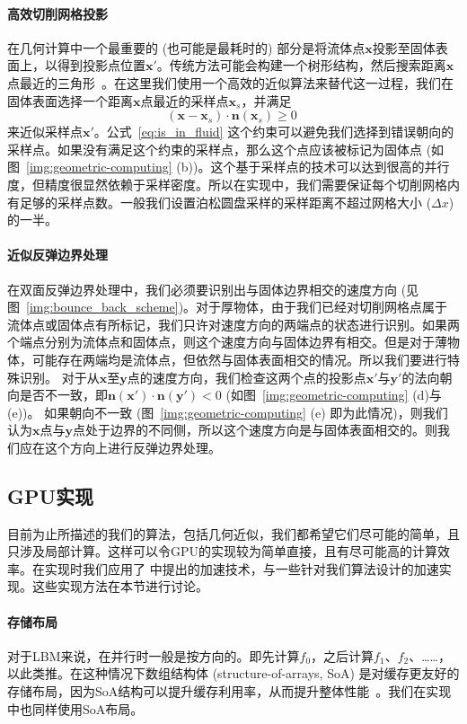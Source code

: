 \paragraph{高效切削网格投影}
在几何计算中一个最重要的 (也可能是最耗时的) 部分是将流体点$\bm{x}$投影至固体表面上，以得到投影点位置$\bm{x}'$。传统方法可能会构建一个树形结构，然后搜索距离$\bm{x}$点最近的三角形~\citep{wang-2012}。在这里我们使用一个高效的近似算法来替代这一过程，我们在固体表面选择一个距离$\bm{x}$点最近的采样点$\bm{x}_s$，并满足
\begin{equation}\label{eq:is_in_fluid}
(\bm{x}-\bm{x}_s)\cdot \bm{n}(\bm{x}_s) \geq 0\;
\end{equation}
来近似采样点$\bm{x}'$。公式~\ref{eq:is_in_fluid} 这个约束可以避免我们选择到错误朝向的采样点。如果没有满足这个约束的采样点，那么这个点应该被标记为固体点 (如图~\ref{img:geometric-computing} (b))。这个基于采样点的技术可以达到很高的并行度，但精度很显然依赖于采样密度。所以在实现中，我们需要保证每个切削网格内有足够的采样点数。一般我们设置泊松圆盘采样的采样距离不超过网格大小 ($\Delta x$) 的一半。

\paragraph{近似反弹边界处理}
在双面反弹边界处理中，我们必须要识别出与固体边界相交的速度方向 (见图~\ref{img:bounce_back_scheme})。对于厚物体，由于我们已经对切削网格点属于流体点或固体点有所标记，我们只许对速度方向的两端点的状态进行识别。如果两个端点分别为流体点和固体点，则这个速度方向与固体边界有相交。但是对于薄物体，可能存在两端均是流体点，但依然与固体表面相交的情况。所以我们要进行特殊识别。
对于从$\bm{x}$至$\bm{y}$点的速度方向，我们检查这两个点的投影点$\bm{x}'$与$\bm{y}'$的法向朝向是否不一致，即$\bm{n}(\bm{x}')\!\cdot\!\bm{n}(\bm{y'})\!<\!0$ (如图~\ref{img:geometric-computing} (d)与(e))。
如果朝向不一致 (图~\ref{img:geometric-computing} (e) 即为此情况)，则我们认为$\bm{x}$点与$\bm{y}$点处于边界的不同侧，所以这个速度方向是与固体表面相交的。则我们应在这个方向上进行反弹边界处理。

\subsection{GPU实现}
目前为止所描述的我们的算法，包括几何近似，我们都希望它们尽可能的简单，且只涉及局部计算。这样可以令GPU的实现较为简单直接，且有尽可能高的计算效率。在实现时我们应用了 \citet{Chen-2021} 中提出的加速技术，与一些针对我们算法设计的加速实现。这些实现方法在本节进行讨论。

\paragraph{存储布局}
对于LBM来说，在并行时一般是按方向的。即先计算$f_0$，之后计算$f_1$、$f_2$、……，以此类推。在这种情况下数组结构体 (structure-of-arrays, SoA) 是对缓存更友好的存储布局，因为SoA结构可以提升缓存利用率，从而提升整体性能~\citep{Chen-2021}。我们在实现中也同样使用SoA布局。

